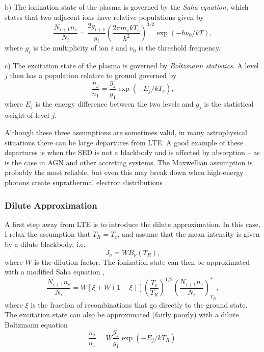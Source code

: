 \smallskip

b) The ionization state of the plasma is governed by the {\em Saha equation},
which states that two adjacent ions have relative populations given by
\begin{equation}
\frac{N_{i+1}n_e}{N_i} = \frac{2g_{i+1}}{g_i} 
\left( \frac{2 \pi m_e kT_e}{h^2} \right)^{3/2}
\exp(-h \nu_0/kT),
\label{eq:saha}
\end{equation}
where $g_i$ is the multiplicity of ion $i$ and $\nu_0$ is the threshold frequency.

\smallskip

c) The excitation state of the plasma is governed by {\em Boltzmann statistics}.
A level $j$ then has a population relative to ground governed by
\begin{equation}
\frac{n_{j}}{n_1} = \frac{g_j}{g_1} \exp(-E_j/kT_e), 
\label{eq:boltzmann}
\end{equation}
where $E_j$ is the energy difference between the two levels and 
$g_j$ is the statistical weight of level $j$. 

\smallskip

Although these three assumptions are sometimes valid, in many astrophysical situations
there can be large departures from LTE. A good example of these departures is when
the SED is not a blackbody and is affected by absorption -- 
as is the case in AGN and other accreting systems. The Maxwellian assumption 
is probably the most reliable, but even this may break down
when high-energy photons create suprathermal electron distributions 
\citep{humphrey2014}. 

\subsubsection{Dilute Approximation}
\label{sec:dilute}
A first step away from LTE is to introduce the dilute approximation. In this case,
I relax the assumption that $T_R = T_e$, and assume that the mean intensity is given
by a dilute blackbody, i.e. 
\begin{equation}
J_\nu = W B_\nu (T_R),
\label{eq:dilute_jnu}
\end{equation}
where $W$ is the dilution factor. The ionization state can then be approximated 
with a modified Saha equation \citep{AL85,ML93},
\begin{equation}
\frac{N_{i+1} n_e}{N_i} = W [\xi + W(1-\xi)]
\left(\frac{T_e}{T_R}\right)^{1/2}
\left(\frac{N_{i+1}n_e}{N_i}\right)^*_{T_R}, \label{eq:ml93}
\end{equation}
where $\xi$ is the fraction of recombinations that go directly to
the ground state.
The excitation state can also be approximated (fairly poorly) 
with a dilute Boltzmann equation \citep{AL85,lucy1999sne}
\begin{equation}
\frac{n_{j}}{n_{1}} = W \frac{g_j}{g_{1}} \exp(-E_j/kT_R).
\label{eq:dilute_boltzmann}
\end{equation}

